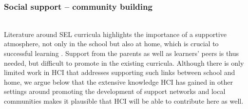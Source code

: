 \documentclass[prodmode,acmtochi]{acmsmall}
\newcommand{\rephrase}[1]{\textrm{\textrm{\textcolor{gray}{#1}}}}
\begin{document}
%
%







\subsubsection{Social support -- community building} 
\label{sec:Embedding-social}
~ \\
Literature around SEL curricula highlights the importance of a supportive atmosphere, not only in the school but also at home, which is crucial to successful learning \cite{Maree2007,Patrikakou2005,Pasi2001}.  Support from the parents as well as learners' peers is thus needed, but difficult to promote in the existing curricula. Although there is only limited work in HCI that addresses supporting such links between school and home, we argue below that the extensive knowledge HCI has gained in other settings around promoting the development of support networks \cite{Skeels2010,Massimi2013,Barak2008} and local communities \cite{Ganglbauer2014,Lewis2012,Lopez2013,Massung2013} makes it plausible that HCI will be able to contribute here as well.
\end{document}
